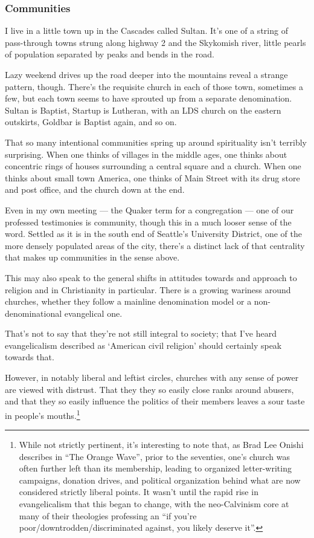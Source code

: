 \hypertarget{communities}{%
\subsubsection*{Communities}\label{communities}}

I live in a little town up in the Cascades called Sultan. It's one of a string of pass-through towns strung along highway 2 and the Skykomish river, little pearls of population separated by peaks and bends in the road.

Lazy weekend drives up the road deeper into the mountains reveal a strange pattern, though. There's the requisite church in each of those town, sometimes a few, but each town seems to have sprouted up from a separate denomination. Sultan is Baptist, Startup is Lutheran, with an LDS church on the eastern outskirts, Goldbar is Baptist again, and so on.

That so many intentional communities spring up around spirituality isn't terribly surprising. When one thinks of villages in the middle ages, one thinks about concentric rings of houses surrounding a central square and a church. When one thinks about small town America, one thinks of Main Street with its drug store and post office, and the church down at the end.

Even in my own meeting --- the Quaker term for a congregation --- one of our professed testimonies is community, though this in a much looser sense of the word. Settled as it is in the south end of Seattle's University District, one of the more densely populated areas of the city, there's a distinct lack of that centrality that makes up communities in the sense above.

This may also speak to the general shifts in attitudes towards and approach to religion and in Christianity in particular. There is a growing wariness around churches, whether they follow a mainline denomination model or a non-denominational evangelical one.

That's not to say that they're not still integral to society; that I've heard evangelicalism described as `American civil religion' should certainly speak towards that.

However, in notably liberal and leftist circles, churches with any sense of power are viewed with distrust. That they they so easily close ranks around abusers, and that they so easily influence the politics of their members leaves a sour taste in people's mouths.\footnote{While not strictly pertinent, it's interesting to note that, as Brad Lee Onishi describes in ``The Orange Wave'', prior to the seventies, one's church was often further left than its membership, leading to organized letter-writing campaigns, donation drives, and political organization behind what are now considered strictly liberal points. It wasn't until the rapid rise in evangelicalism that this began to change, with the neo-Calvinism core at many of their theologies professing an ``if you're poor/downtrodden/discriminated against, you likely deserve it''.}

